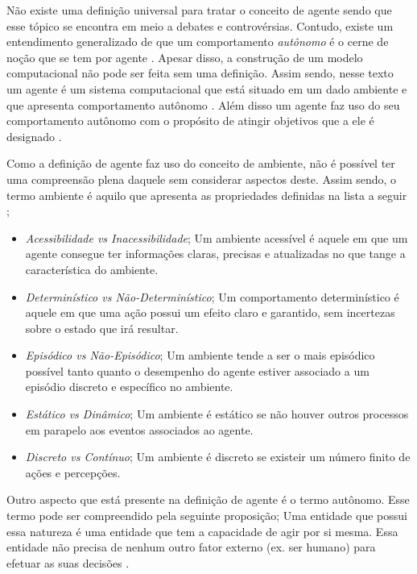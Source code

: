 Não existe uma definição universal para tratar o conceito de agente sendo que esse tópico se encontra em meio a debates e controvérsias. Contudo, existe um entendimento generalizado de que um comportamento \textit{autônomo} é o cerne de noção que se tem por agente \cite{whatisagent}. Apesar disso, a construção de um modelo computacional não pode ser feita sem uma definição. Assim sendo, nesse texto um agente é um sistema computacional que está situado em um dado ambiente e que apresenta comportamento autônomo \cite{whatisagent}. Além disso um agente faz uso do seu comportamento autônomo com o propósito de atingir objetivos que a ele é designado \cite{whatisagent}.

Como a definição de agente faz uso do conceito de ambiente, não é possível ter uma compreensão plena daquele sem considerar aspectos deste. Assim sendo, o termo ambiente  é aquilo que apresenta as propriedades definidas na lista a seguir \cite{artificialinteligencemodermapproach} \cite{whatisagent}; 
\begin{itemize}
    \item \textit{Acessibilidade vs Inacessibilidade}; Um ambiente acessível é aquele em que um agente consegue ter informações claras, precisas e atualizadas no que tange a característica do ambiente.
    \item \textit{Determinístico vs Não-Determinístico}; Um comportamento determinístico é aquele em que uma ação possui um efeito claro e garantido, sem incertezas sobre o estado que irá resultar.
    \item \textit{Episódico vs Não-Episódico}; Um ambiente tende a ser o mais episódico possível tanto quanto o desempenho do agente estiver associado a um episódio discreto e específico no ambiente.
    \item \textit{Estático vs Dinâmico}; Um ambiente é estático se não houver outros processos em parapelo aos eventos associados ao agente.
    \item \textit{Discreto vs Contínuo}; Um ambiente é discreto se existeir um número finito de ações e percepções. 
\end{itemize}

Outro aspecto que está presente na definição de agente é o termo autônomo. Esse termo pode ser compreendido pela seguinte proposição; Uma entidade que possui essa natureza é uma entidade que tem a capacidade de agir por si mesma. Essa entidade não precisa de nenhum outro fator externo (ex. ser humano) para efetuar as suas decisões \cite{whatisagent}.

